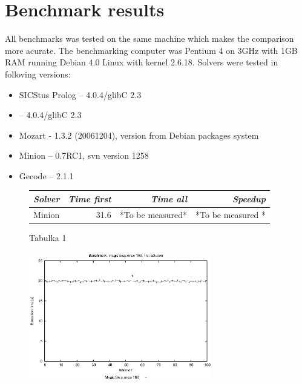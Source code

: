 \chapter{Benchmark results}
All benchmarks was tested on the same machine which makes the comparison more 
acurate. The benchmarking computer was Pentium 4 on 3GHz with 1GB RAM running
Debian 4.0 Linux with kernel 2.6.18. Solvers were tested in folloving versions:
\begin{itemize}
\item SICStus Prolog -- 4.0.4/glibC 2.3
\item \eclipse -- 4.0.4/glibC 2.3
\item Mozart - 1.3.2 (20061204), version from Debian packages system 
\item Minion -- 0.7RC1, svn version 1258
\item Gecode -- 2.1.1
\end{itemize}

\begin{figure}[Table]
\caption{Tabulka 1}
\begin{tabular}{lrrr}
\hline \itshape Solver	&	 \itshape Time first	&	\itshape Time all & \itshape Speedup \\
\hline Minion	&	 31.6 & *To be measured* & *To be measured * \\
\hline
\end{tabular}
\end{figure}

\begin{figure}
\begin{center}
\includegraphics[width=8cm]{images/grafy/100magic.eps}
\end{center}
\end{figure} 
